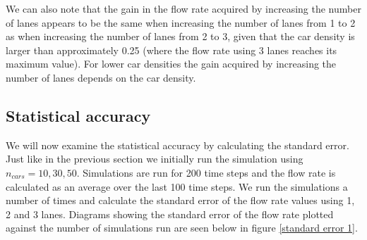 \documentclass[a4paper,12pt]{article}
\begin{document}
We can also note that the gain in the flow rate acquired by increasing the number of lanes appears to be the same when increasing the number of lanes from 1 to 2 as when
increasing the number of lanes from 2 to 3, given that the car density is larger than approximately 0.25 (where the flow rate using 3 lanes reaches its maximum value).
For lower car densities the gain acquired by increasing the number of lanes depends on the car density.

\subsection*{Statistical accuracy}
We will now examine the statistical accuracy by calculating the standard error. Just like in the previous section we initially run the simulation
using $n_{cars}=10, 30, 50$. Simulations are run for 200 time steps and the flow rate is calculated as an average over the last 100 time steps.
We run the simulations a number of times and calculate the standard error of the flow rate values using 1, 2 and 3 lanes. Diagrams showing the
standard error of the flow rate plotted against the number of simulations run are seen below in figure \ref*{standard error 1}.
\end{document}
